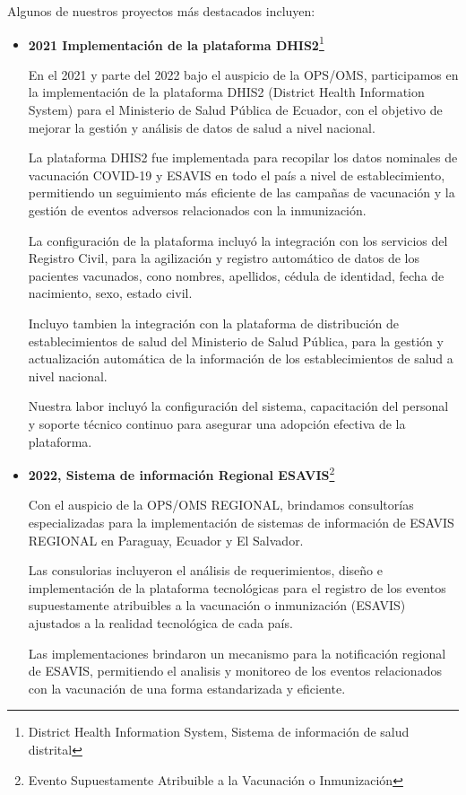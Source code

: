 Algunos de nuestros proyectos más destacados incluyen:
\begin{itemize}
    \item \textbf{2021 Implementación de la plataforma DHIS2}\footnote{ District Health Information System, Sistema de información de salud distrital}
    
        En el 2021 y parte del 2022 bajo el auspicio de la OPS/OMS, participamos en la implementación de la plataforma DHIS2 (District Health Information System) para el Ministerio de Salud Pública de Ecuador, con el objetivo de mejorar la gestión y análisis de datos de salud a nivel nacional.

        La plataforma DHIS2 fue implementada para recopilar los datos nominales de vacunación COVID-19 y ESAVIS en todo el país a nivel de establecimiento, permitiendo un seguimiento más eficiente de las campañas de vacunación y la gestión de eventos adversos relacionados con la inmunización.

        La configuración de la plataforma incluyó la integración con los servicios del Registro Civil, para la agilización y registro automático de datos de los pacientes vacunados, cono nombres, apellidos, cédula de identidad, fecha de nacimiento, sexo, estado civil.

        Incluyo tambien la integración con la plataforma de distribución de establecimientos de salud del Ministerio de Salud Pública, para la gestión y actualización automática de la información de los establecimientos de salud a nivel nacional.

        Nuestra labor incluyó la configuración del sistema, capacitación del personal y soporte técnico continuo para asegurar una adopción efectiva de la plataforma.

    \item \textbf{2022, Sistema de información Regional ESAVIS}\footnote{Evento Supuestamente Atribuible a la Vacunación o Inmunización} 

        Con el auspicio de la OPS/OMS REGIONAL, brindamos consultorías especializadas para la implementación de sistemas de información de ESAVIS REGIONAL en Paraguay, Ecuador y El Salvador.

        Las consulorias incluyeron el análisis de requerimientos, diseño e implementación de la plataforma tecnológicas para el registro de los eventos supuestamente atribuibles a la vacunación o inmunización (ESAVIS) ajustados a la realidad tecnológica de cada país.

        Las implementaciones brindaron un mecanismo para la notificación regional de ESAVIS, permitiendo el analisis y monitoreo de los eventos relacionados con la vacunación de una forma estandarizada y eficiente.
        

\end{itemize}
